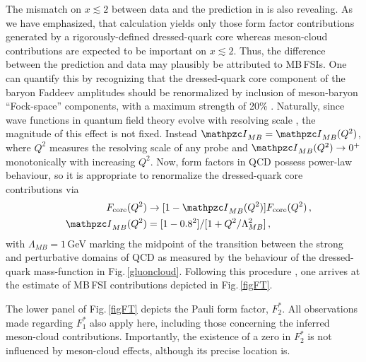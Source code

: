 The mismatch on $x\lesssim 2$ between data and the prediction in \cite{Segovia:2015hra} is also revealing.  As we have emphasized, that calculation yields only those form factor contributions generated by a rigorously-defined dressed-quark core whereas meson-cloud contributions are expected to be important on $x\lesssim 2$.  Thus, the difference between the prediction and data may plausibly be attributed to MB\,FSIs.  One can quantify this by recognizing that the dressed-quark core component of the baryon Faddeev amplitudes should be renormalized by inclusion of meson-baryon ``Fock-space'' components, with a maximum strength of 20\% \cite{Cloet:2008fw, Eichmann:2008ef, Bijker:2009up, Aznauryan:2016wwm}.  Naturally, since wave functions in quantum field theory evolve with resolving scale \cite{Lepage:1979zb, Lepage:1980fj, Efremov:1979qk, Raya:2015gva, Gao:2017mmp}, the magnitude of this effect is not fixed.  Instead ${\mathpzc I}_{MB}={\mathpzc I}_{MB}(Q^2)$, where $Q^2$ measures the resolving scale of any probe and ${\mathpzc I}_{MB}(Q^2) \to 0^+$ monotonically with increasing $Q^2$.  Now, form factors in QCD possess power-law behaviour, so it is appropriate to renormalize the dressed-quark core contributions via
\begin{subequations}
\begin{align}
\label{eqMBFSI}
F_{\rm core}(Q^2) & \to [1- {\mathpzc I}_{MB}(Q^2)] F_{\rm core}(Q^2)\,,\\
\quad {\mathpzc I}_{MB}(Q^2) & = [1-0.8^2]/[1+Q^2/\Lambda_{MB}^2]\,,
\end{align}
\end{subequations}
with $\Lambda_{MB}=1\,$GeV marking the midpoint of the transition between the strong and perturbative domains of QCD as measured by the behaviour of the dressed-quark mass-function in Fig.\,\ref{gluoncloud}.  Following this procedure \cite{Roberts:2016dnb}, one arrives at the estimate of MB\,FSI contributions depicted in Fig.\,\ref{figFT}.

The lower panel of Fig.\,\ref{figFT} depicts the Pauli form factor, $F_{2}^{\ast}$.  All observations made regarding $F_{1}^{\ast}$ also apply here, including those concerning the inferred meson-cloud contributions.  Importantly, the existence of a zero in $F_{2}^{\ast}$ is not influenced by meson-cloud effects, although its precise location is.

